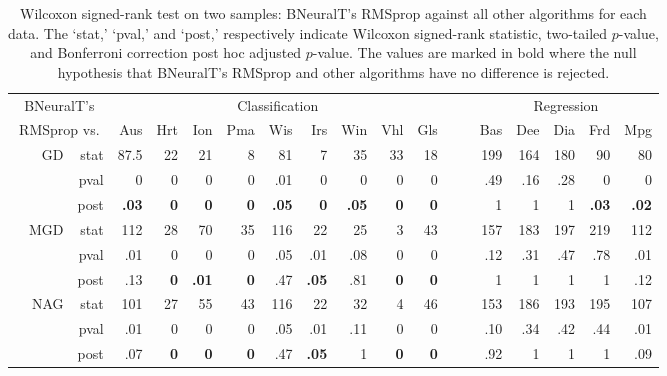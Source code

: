 \documentclass[11pt,a4paper]{article}
\begin{document}
    \begin{table} \small
        \centering
        \renewcommand{\arraystretch}{1.05}
        \setlength{\tabcolsep}{3pt}
        \caption{Wilcoxon signed-rank test on two samples: BNeuralT's RMSprop against all other algorithms for each data. The `stat,' `pval,' and `post,' respectively indicate Wilcoxon signed-rank statistic, two-tailed $p$-value, and Bonferroni correction post hoc adjusted $p$-value. The values are marked in bold where the null hypothesis that BNeuralT's RMSprop and other algorithms have no difference is rejected.}
        \label{tab:BNeuralT_RMSprop_VS_All_W_Rank_Test}\begin{tabular}[t]{lrrrrrrrrrrrrrrrrr}
            \toprule
            \multicolumn{3}{c}{BNeuralT's} & \multicolumn{9}{c}{Classification} & ~~ & \multicolumn{5}{c}{Regression} \\
            \cline{4-12}\cline{14-18}
            \multicolumn{3}{c}{RMSprop vs.}  & Aus & Hrt & Ion & Pma & Wis & Irs & Win & Vhl & Gls & ~ & Bas & Dee & Dia & Frd & Mpg \\
            \midrule
            \parbox[t]{3mm}{}
            & GD & stat & 87.5 & 22 & 21 & 8 & 81 & 7 & 35 & 33 & 18 &  & 199 & 164 & 180 & 90 & 80 \\
            &  & pval & 0 & 0 & 0 & 0 & .01 & 0 & 0 & 0 & 0 &  & .49 & .16 & .28 & 0 & 0 \\
            &  & post & \textbf{.03} & \textbf{0} & \textbf{0} & \textbf{0} & \textbf{.05} & \textbf{0} & \textbf{.05} & \textbf{0} & \textbf{0} &  & 1 & 1 & 1 & \textbf{.03} & \textbf{.02} \\
& MGD & stat & 112 & 28 & 70 & 35 & 116 & 22 & 25 & 3 & 43 &  & 157 & 183 & 197 & 219 & 112 \\
            &  & pval & .01 & 0 & 0 & 0 & .05 & .01 & .08 & 0 & 0 &  & .12 & .31 & .47 & .78 & .01 \\
            &  & post & .13 & \textbf{0} & \textbf{.01} & \textbf{0} & .47 & \textbf{.05} & .81 & \textbf{0} & \textbf{0 }&  & 1 & 1 & 1 & 1 & .12 \\
& NAG & stat & 101 & 27 & 55 & 43 & 116 & 22 & 32 & 4 & 46 &  & 153 & 186 & 193 & 195 & 107 \\
            &  & pval & .01 & 0 & 0 & 0 & .05 & .01 & .11 & 0 & 0 &  & .10 & .34 & .42 & .44 & .01 \\
            &  & post & .07 & \textbf{0} & \textbf{0} & \textbf{0} & .47 & \textbf{.05} & 1 & \textbf{0} & \textbf{0} &  & .92 & 1 & 1 & 1 & .09 \\

\end{tabular}
\end{table}
\end{document}
